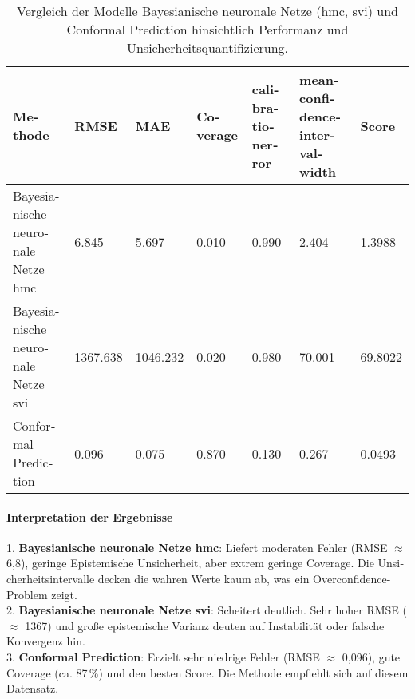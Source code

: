 \begin{otherlanguage}{ngerman}
\begin{table}[!htbp]
  \centering
  \footnotesize
  \begin{tabularx}{\textwidth}{|>{\arraybackslash}X|X|X|X|X|X|X|}
  \hline
  \textbf{Methode} & \textbf{RMSE} & \textbf{MAE} & \textbf{Coverage} & \textbf{\gls{calibrationerror}} & \textbf{\gls{meanconfidenceintervalwidth}} & \textbf{Score} \\
  \hline
  \gls{Bayesianische neuronale Netze} \gls{hmc} & 6.845 & 5.697 & 0.010 & 0.990 & 2.404 & 1.3988 \\
  \hline
  \gls{Bayesianische neuronale Netze} \gls{svi} & 1367.638 & 1046.232 & 0.020 & 0.980 & 70.001 & 69.8022 \\
  \hline
  \gls{Conformal Prediction} & 0.096 & 0.075 & 0.870 & 0.130 & 0.267 & 0.0493 \\
  \hline
  \end{tabularx}
  \caption{Vergleich der Modelle \gls{Bayesianische neuronale Netze} (\gls{hmc}, \gls{svi}) und \gls{Conformal Prediction} hinsichtlich Performanz und Unsicherheitsquantifizierung.}
  \label{tab:r8_results}
\end{table}



\paragraph{Interpretation der Ergebnisse}\par\vspace{1\baselineskip}\noindent

1. \textbf{\gls{Bayesianische neuronale Netze} \gls{hmc}}: Liefert moderaten Fehler (RMSE $\approx$ 6{,}8), geringe \gls{Epistemische Unsicherheit}, aber extrem geringe Coverage. Die Unsicherheitsintervalle decken die wahren Werte kaum ab, was ein Overconfidence-Problem zeigt.\\
2. \textbf{\gls{Bayesianische neuronale Netze} \gls{svi}}: Scheitert deutlich. Sehr hoher RMSE ($\approx$ 1367) und große epistemische Varianz deuten auf Instabilität oder falsche Konvergenz hin.\\
3. \textbf{\gls{Conformal Prediction}}: Erzielt sehr niedrige Fehler (RMSE $\approx$ 0{,}096), gute Coverage (ca. 87\,\%) und den besten Score. Die Methode empfiehlt sich auf diesem Datensatz.



\pagebreak


\end{otherlanguage}
